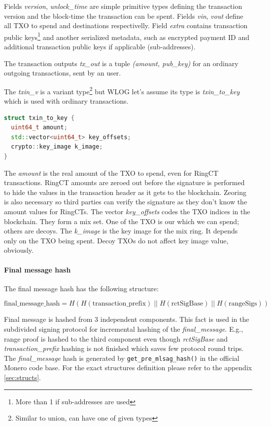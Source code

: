 \documentclass[]{article}
\begin{document}
Fields \emph{version}, \emph{unlock\_time} are simple primitive types defining the transaction version and the block-time the transaction can be spent. Fields \emph{vin}, \emph{vout} define all TXO to spend and destinations respectivelly. Field \emph{extra} contains transaction public keys\footnote{More than 1 if sub-addresses are used} and another serialized metadata, such as encrypted payment ID and additional transaction public keys if applicable (sub-addresses).

The transaction outputs \emph{tx\_out} is a tuple \emph{(amount, pub\_key)} for an ordinary outgoing transactions, sent by an user. 

The \emph{txin\_v} is a variant type\footnote{Similar to union, can have one of given types} but WLOG let's assume its type is \emph{txin\_to\_key} which is used with ordinary transactions. 

\begin{lstlisting}[language=c++]
struct txin_to_key {
  uint64_t amount;
  std::vector<uint64_t> key_offsets;
  crypto::key_image k_image;
}
\end{lstlisting}

The \emph{amount} is the real amount of the TXO to spend, even for RingCT transactions. RingCT amounts are zeroed out before the signature is performed to hide the values in the transaction header as it gets to the blockchain. Zeoring is also necessary so third parties can verify the signature as they don't know the amount values for RingCTs.
The vector \emph{key\_offsets} codes the TXO indices in the blockchain. They form a mix set. One of the TXO is our which we can spend; others are decoys.
The \emph{k\_image} is the key image for the mix ring. It depends only on the TXO being spent. Decoy TXOs do not affect key image value, obviously.

\paragraph{Final message hash} The final message hash has the following structure:
	
\begin{equation}  \label{eq:final_message_hash}
\text{final\_message\_hash} = H(H(\text{transaction\_prefix}) \; || \; H(\text{rctSigBase}) \; || \; H(\text{rangeSigs}))
\end{equation}

Final message is hashed from 3 independent components. This fact is used in the subdivided signing protocol for incremental hashing of the \emph{final\_message}. E.g., range proof is hashed to the third component even though \emph{rctSigBase} and \emph{transaction\_prefix} hashing is not finished which saves few protocol round trips.
The \emph{final\_message} hash is generated by \verb|get_pre_mlsag_hash()| in the official Monero code base.
For the exact structures definition please refer to the appendix \ref{sec:structs}.
\end{document}
